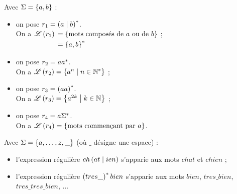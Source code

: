 \begin{ex}
Avec \(\Sigma=\left\lbrace a,b\right\rbrace\) :

\begin{itemize}
    \item on pose \(r_1=\left(a\mid b\right)^{*}\). \\ On a \(\mathscr{L}\left(r_1\right)\begin{aligned}[t]
        &=\left\lbrace\text{mots composés de }a\text{ ou de }b\right\rbrace \\
        &=\left\lbrace a,b\right\rbrace^{*}
    \end{aligned}\) ; \\
    \item on pose \(r_2=aa^{*}\). \\ On a \(\mathscr{L}\left(r_2\right)=\left\lbrace a^n\;\middle|\; n\in\mathbb{N}^*\right\rbrace\) ; \\
    \item on pose \(r_3=\left(aa\right)^{*}\). \\ On a \(\mathscr{L}\left(r_3\right)=\left\lbrace a^{2k}\;\middle|\; k\in\mathbb{N}\right\rbrace\) ; \\
    \item on pose \(r_4=a\Sigma^{*}\). \\ On a \(\mathscr{L}\left(r_4\right)=\left\lbrace\text{mots commençant par }a\right\rbrace\).
\end{itemize}

Avec \(\Sigma=\left\lbrace a,\dots,z,\_\right\rbrace\) (où \(\_\) désigne une espace) :

\begin{itemize}
    \item l'expression régulière \(ch\left(at\mid ien\right)\) s'apparie aux mots \(chat\) et \(chien\) ; \\
    \item l'expression régulière \(\left(tres\_\right)^{*} bien\) s'apparie aux mots \(bien\), \(tres\_ bien\), \(tres\_ tres\_ bien\), ...
\end{itemize}
\end{ex}
